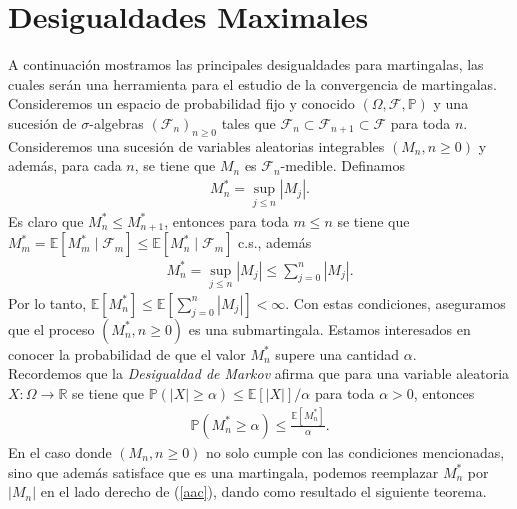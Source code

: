 \section{Desigualdades Maximales}
A continuación mostramos las principales desigualdades para martingalas, las cuales serán una herramienta para el estudio de la convergencia de martingalas. Consideremos un espacio de probabilidad fijo y conocido $(\Omega, \mathcal{F}, \mathbb{P})$ y una sucesión de $\sigma$-algebras $(\mathcal{F}_n)_{n \geq 0}$ tales que $\mathcal{F}_n \subset \mathcal{F}_{n+1} \subset \mathcal{F}$ para toda $n$. Consideremos una sucesión de variables aleatorias integrables $(M_n, n \geq 0)$ y además, para cada $n$, se tiene que $M_n$ es $\mathcal{F}_n$-medible. Definamos
\begin{align*}
	M_n^{*} = \sup_{j \leq n} |M_j|.
\end{align*}
Es claro que $M_n^{*} \leq M_{n+1}^{*}$, entonces para toda $m \leq n$ se tiene que $M_m^{*} = \mathbb{E}[M_m^{*} \mid \mathcal{F}_m] \leq \mathbb{E}[M_{n}^{*} \mid \mathcal{F}_m]$ c.s., además 
\begin{align*}
	M_n^{*} = \sup_{j \leq n} |M_j| \leq \sum_{j=0}^n |M_j|.
\end{align*}
Por lo tanto, $\mathbb{E}[M_n^{*} ]\leq \mathbb{E}[\sum_{j=0}^n |M_j|] < \infty$. Con estas condiciones, aseguramos que el proceso $(M_n^{*}, n \geq 0)$ es una submartingala. Estamos interesados en conocer la probabilidad de que el valor $M_n^{*}$ supere una cantidad $\alpha$. \\

Recordemos que la \emph{Desigualdad de Markov} afirma que \cite[p.~29]{jacodprotter} para una variable aleatoria $X: \Omega \rightarrow \mathbb{R}$ se tiene que $\mathbb{P}(|X| \geq \alpha) \leq \mathbb{E}[|X|]/\alpha$ para toda $\alpha > 0$, entonces
\begin{align}
	\mathbb{P}(M_n^{*} \geq \alpha) \leq \frac{\mathbb{E}[M_n^{*}]}{\alpha}. \label{aac}
\end{align}
En el caso donde $(M_n, n \geq 0)$ no solo cumple con las condiciones mencionadas, sino que además satisface que es una martingala, podemos reemplazar $M_n^{*}$ por $|M_n|$ en el lado derecho de (\ref{aac}), dando como resultado el siguiente teorema.

